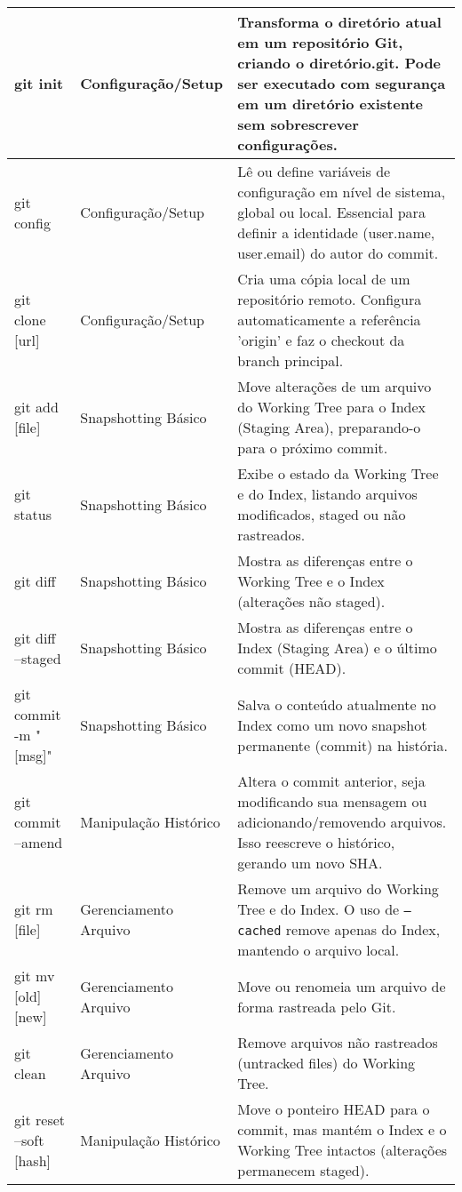 \begin{longtable}{|p{3cm}|p{4cm}|p{7cm}|}
    git init & Configuração/Setup & Transforma o diretório atual em um repositório Git, criando o diretório.git. Pode ser executado com segurança em um diretório existente sem sobrescrever configurações. \\
    \hline
    git config & Configuração/Setup & Lê ou define variáveis de configuração em nível de sistema, global ou local. Essencial para definir a identidade (user.name, user.email) do autor do commit. \\
    \hline
    git clone [url] & Configuração/Setup & Cria uma cópia local de um repositório remoto. Configura automaticamente a referência 'origin' e faz o checkout da branch principal. \\
    \hline
    git add [file] & Snapshotting Básico & Move alterações de um arquivo do Working Tree para o Index (Staging Area), preparando-o para o próximo commit. \\
    \hline
    git status & Snapshotting Básico & Exibe o estado da Working Tree e do Index, listando arquivos modificados, staged ou não rastreados. \\
    \hline
    git diff & Snapshotting Básico & Mostra as diferenças entre o Working Tree e o Index (alterações não staged). \\
    \hline
    git diff --staged & Snapshotting Básico & Mostra as diferenças entre o Index (Staging Area) e o último commit (HEAD). \\
    \hline
    git commit -m "[msg]" & Snapshotting Básico & Salva o conteúdo atualmente no Index como um novo snapshot permanente (commit) na história. \\
    \hline
    git commit --amend & Manipulação Histórico & Altera o commit anterior, seja modificando sua mensagem ou adicionando/removendo arquivos. Isso reescreve o histórico, gerando um novo SHA. \\
    \hline
    git rm [file] & Gerenciamento Arquivo & Remove um arquivo do Working Tree e do Index. O uso de \texttt{--cached} remove apenas do Index, mantendo o arquivo local. \\
    \hline
    git mv [old][new] & Gerenciamento Arquivo & Move ou renomeia um arquivo de forma rastreada pelo Git. \\
    \hline
    git clean & Gerenciamento Arquivo & Remove arquivos não rastreados (untracked files) do Working Tree. \\
    \hline
    git reset --soft [hash] & Manipulação Histórico & Move o ponteiro HEAD para o commit, mas mantém o Index e o Working Tree intactos (alterações permanecem staged). \\

\end{longtable}
